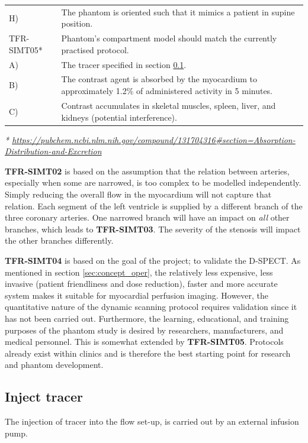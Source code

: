 \begin{table} [H]
\begin{tabular}{l|p{120mm}|}
	\hspace{1.5cm} H) & The phantom is oriented such that it mimics a patient in supine position. \\
	TFR-SIMT05* & Phantom's compartment model should match the currently practised protocol.\\
	\hspace{1.5cm} A) & The tracer specified in section \ref{sec:inj_tracer}.\\
	\hspace{1.5cm} B) & The contrast agent is absorbed by the myocardium to approximately 1.2\% of administered activity in 5 minutes. \\
	\hspace{1.5cm} C) & Contrast accumulates in skeletal muscles, spleen, liver, and kidneys (potential interference). \\
	\cline{2-2}
\end{tabular}
\raggedright
\textit{* \url{https://pubchem.ncbi.nlm.nih.gov/compound/131704316\#section=Absorption-Distribution-and-Excretion}}
\end{table}

\textbf{TFR-SIMT02} is based on the assumption that the relation between arteries, especially when some are narrowed, is too complex to be modelled independently. Simply reducing the overall flow in the myocardium will not capture that relation. Each segment of the left ventricle is supplied by a different branch of the three coronary arteries. One narrowed branch will have an impact on \textit{all} other branches, which leads to \textbf{TFR-SIMT03}. The severity of the stenosis will impact the other branches differently.

\textbf{TFR-SIMT04} is based on the goal of the project; to validate the D-SPECT. As mentioned in section \ref{sec:concept_oper}, the relatively less expensive, less invasive (patient friendliness and dose reduction), faster and more accurate system makes it suitable for myocardial perfusion imaging. However, the quantitative nature of the dynamic scanning protocol requires validation since it has not been carried out. Furthermore, the learning, educational, and training purposes of the phantom study is desired by researchers, manufacturers, and medical personnel. This is somewhat extended by \textbf{TFR-SIMT05}. Protocols already exist within clinics and is therefore the best starting point for research and phantom development.

\subsection{Inject tracer}
\label{sec:inj_tracer}
The injection of tracer into the flow set-up, is carried out by an external infusion pump. 

